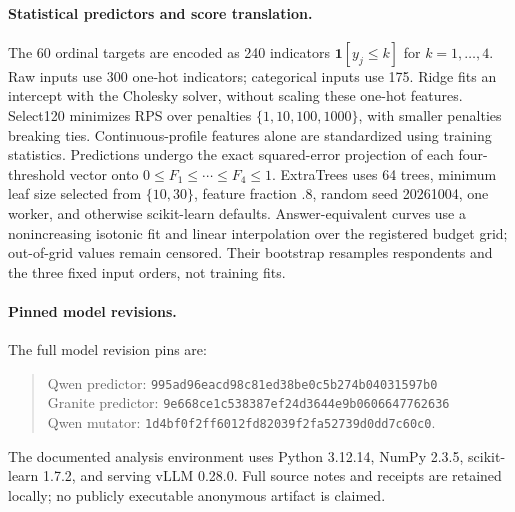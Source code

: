 \paragraph{Statistical predictors and score translation.}
The 60 ordinal targets are encoded as 240 indicators $\mathbf{1}[y_j\leq k]$
for $k=1,\ldots,4$. Raw inputs use 300 one-hot indicators; categorical inputs
use 175. Ridge fits an intercept with the Cholesky solver, without scaling
these one-hot features. Select120 minimizes RPS over penalties
$\{1,10,100,1000\}$, with smaller penalties breaking ties. Continuous-profile
features alone are standardized using training statistics. Predictions undergo
the exact squared-error projection of each four-threshold vector onto
$0\leq F_1\leq\cdots\leq F_4\leq1$. ExtraTrees uses 64 trees,
minimum leaf size selected from $\{10,30\}$, feature fraction .8, random seed
20261004, one worker, and otherwise scikit-learn defaults. Answer-equivalent
curves use a nonincreasing isotonic fit and linear interpolation over the
registered budget grid; out-of-grid values remain censored. Their bootstrap
resamples respondents and the three fixed input orders, not training fits.

\paragraph{Pinned model revisions.}
The full model revision pins are:
\begin{quote}\small
Qwen predictor: \texttt{995ad96eacd98c81ed38be0c5b274b04031597b0}\\
Granite predictor: \texttt{9e668ce1c538387ef24d3644e9b0606647762636}\\
Qwen mutator: \texttt{1d4bf0f2ff6012fd82039f2fa52739d0dd7c60c0}.
\end{quote}
The documented analysis environment uses Python 3.12.14, NumPy 2.3.5,
scikit-learn 1.7.2, and serving vLLM 0.28.0. Full source notes and receipts
are retained locally; no publicly executable anonymous artifact is claimed.
